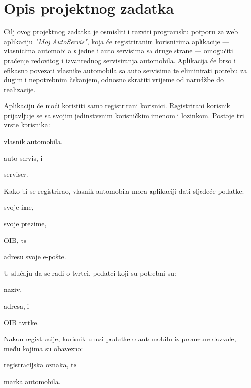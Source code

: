 \chapter{Opis projektnog zadatka}
		
		

		
		Cilj ovog projektnog zadatka je osmisliti i razviti programsku potporu  za web aplikaciju \textit{"Moj AutoServis"},  koja će registriranim korisnicima aplikacije --- vlasnicima automobila s jedne i auto servisima sa druge strane --- omogućiti praćenje redovitog i izvanrednog servisiranja automobila. Aplikacija će brzo i efikasno povezati  vlasnike automobila sa auto servisima te eliminirati potrebu za dugim i nepotrebnim čekanjem, odnosno skratiti vrijeme od narudžbe do realizacije. 
		
		
		
		
		Aplikaciju će moći koristiti samo registrirani korisnici. Registrirani korisnik prijavljuje se sa svojim jedinstvenim korisničkim imenom i lozinkom. Postoje tri vrste korisnika:
		\begin{packed_item}
			\item vlasnik automobila,
			\item auto-servis, i
			\item serviser.
		\end{packed_item}
		
		
		 Kako bi se registrirao, vlasnik automobila mora aplikaciji dati sljedeće podatke:
		\begin{packed_item}
			\item svoje ime,
			\item svoje prezime,
			\item OIB, te
			\item adresu svoje e-pošte.
		\end{packed_item}
		
		U slučaju da se radi o tvrtci, podatci koji su potrebni su:
		\begin{packed_item}
			\item naziv,
			\item adresa, i
			\item OIB tvrtke.
		\end{packed_item}
		
		Nakon registracije, korisnik unosi podatke o automobilu iz prometne dozvole, među kojima su obavezno:
		\begin{packed_item}
			\item registracijska oznaka, te
			\item marka automobila.
		\end{packed_item}
		
